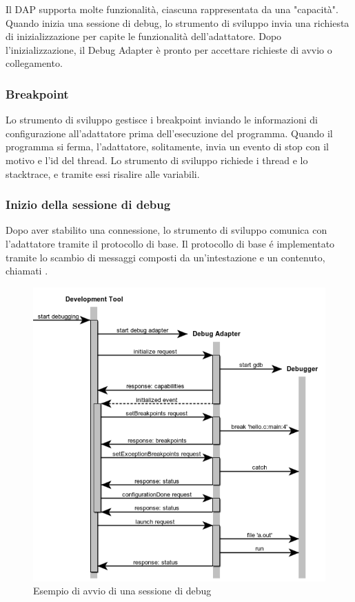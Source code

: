 Il DAP supporta molte funzionalità, ciascuna rappresentata da una "capacità". Quando inizia una sessione di debug, lo strumento di sviluppo invia una richiesta di inizializzazione per capite le funzionalità dell'adattatore. Dopo l'inizializzazione, il Debug Adapter è pronto per accettare richieste di avvio o collegamento.
\subsubsection*{Breakpoint}
Lo strumento di sviluppo gestisce i breakpoint inviando le informazioni di configurazione all'adattatore prima dell'esecuzione del programma. Quando il programma si ferma, l'adattatore, solitamente, invia un evento di stop con il motivo e l'id del thread. Lo strumento di sviluppo richiede i thread e lo stacktrace, e tramite essi risalire alle variabili.

\subsubsection*{Inizio della sessione di debug}
Dopo aver stabilito una connessione, lo strumento di sviluppo comunica con l'adattatore tramite il protocollo di base. Il protocollo di base é implementato tramite lo scambio di messaggi composti da un'intestazione e un contenuto, chiamati . 

\begin{figure}[H]    
    \centering
    \includegraphics[width=0.7\columnwidth]{images/init-launch.png}
    \caption{Esempio di avvio di una sessione di debug\cite{DAP}}
\end{figure}

